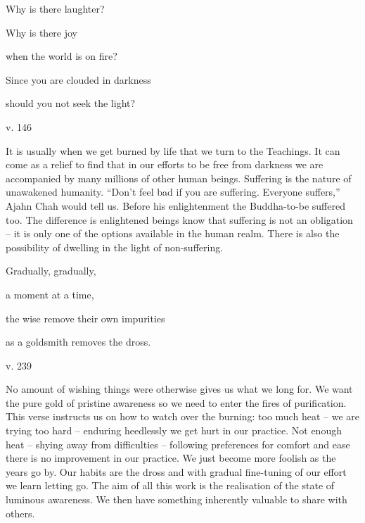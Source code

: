 \documentclass[a4paper,portrait,12pt]{article}
\begin{document}
Why is there laughter?


Why is there joy 


when the world is on fire? 


Since you are clouded in darkness


should you not seek the light?





v. 146





It is usually when we get burned by life that we turn to the Teachings. It can come as a relief to find that in our efforts to be free from darkness we are accompanied by many millions of other human beings. Suffering is the nature of unawakened humanity. ``Don't feel bad if you are suffering. Everyone suffers,'' Ajahn Chah would tell us. Before his enlightenment the Buddha-to-be suffered too. The difference is enlightened beings know that suffering is not an obligation -- it is only one of the options available in the human realm. There is also the possibility of dwelling in the light of non-suffering.














Gradually, gradually,


a moment at a time,


the wise remove their own impurities 


as a goldsmith removes the dross.





v. 239





No amount of wishing things were otherwise gives us what we long for. We want the pure gold of pristine awareness so we need to enter the fires of purification. This verse instructs us on how to watch over the burning: too much heat -- we are trying too hard -- enduring heedlessly we get hurt in our practice. Not enough heat -- shying away from difficulties -- following preferences for comfort and ease there is no improvement in our practice. We just become more foolish as the years go by. Our habits are the dross and with gradual fine-tuning of our effort we learn letting go. The aim of all this work is the realisation of the state of luminous awareness. We then have something inherently valuable to share with others.
\end{document}
